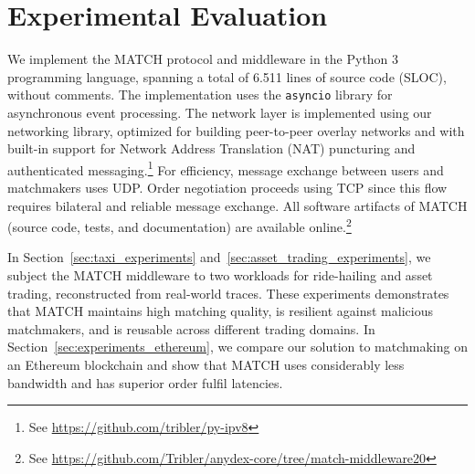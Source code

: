 \section{Experimental Evaluation}
\label{sec:match_experiments}
We implement the MATCH protocol and middleware in the Python 3 programming language, spanning a total of 6.511 lines of source code (SLOC), without comments.
The implementation uses the \texttt{asyncio} library for asynchronous event processing.
The network layer is implemented using our networking library, optimized for building peer-to-peer overlay networks and with built-in support for Network Address Translation (NAT) puncturing and authenticated messaging.\footnote{See \url{https://github.com/tribler/py-ipv8}}
For efficiency, message exchange between users and matchmakers uses UDP.
Order negotiation proceeds using TCP since this flow requires bilateral and reliable message exchange.
All software artifacts of MATCH (source code, tests, and documentation) are available online.\footnote{See \url{https://github.com/Tribler/anydex-core/tree/match-middleware20}}

In Section~\ref{sec:taxi_experiments} and~\ref{sec:asset_trading_experiments}, we subject the MATCH middleware to two workloads for ride-hailing and asset trading, reconstructed from real-world traces.
These experiments demonstrates that MATCH maintains high matching quality, is resilient against malicious matchmakers, and is reusable across different trading domains.
In Section~\ref{sec:experiments_ethereum}, we compare our solution to matchmaking on an Ethereum blockchain and show that MATCH uses considerably less bandwidth and has superior order fulfil latencies.

